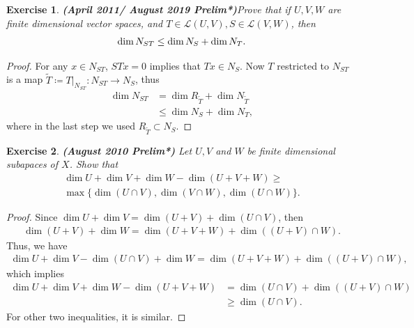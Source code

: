 \documentclass[11pt]{book}
\newtheorem{exercise}{Exercise}[section]
\theoremstyle{definition}
\numberwithin{equation}{chapter}
\begin{document}
\medskip

\begin{exercise}{\bf (April 2011/ August 2019 Prelim*)}\label{April_2011_p1}
Prove that if $U,V,W$ are finite dimensional vector spaces, and $T\in\mathscr{L}(U,V), S\in\mathscr{L}(V,W)$, then
\begin{align*}
    {\rm dim}\, N_{ST} \leq {\rm dim}\, N_S + {\rm dim}\, N_T.
\end{align*}
\end{exercise}
\begin{proof}
For any $x \in N_{ST}$, $STx = 0$ implies that $Tx \in N_S$. Now $T$ restricted to $N_{ST}$ is a map $\widetilde{T} \coloneqq T|_{N_{ST}}: N_{ST} \to N_S$, thus
\begin{align*}
    \dim N_{ST} & = \dim R_{\widetilde{T}} + \dim N_{\widetilde{T}} \\
    & \leq \dim N_S + \dim N_T,
\end{align*}
where in the last step we used $R_{\widetilde{T}} \subset N_S$.
\end{proof}

\medskip

\begin{exercise}{\bf (August 2010 Prelim*)}
Let $U, V$ and $W$ be finite dimensional subapaces of $X$. Show that
\begin{align*}
    \dim U + \dim V + \dim W - \dim (U + V + W) \geq \\
    \max \{\dim(U \cap V), \dim(V \cap W), \dim(U \cap W)\}.
\end{align*}
\end{exercise}
\begin{proof}
Since $\dim U + \dim V = \dim (U + V) + \dim (U \cap V)$, then 
\begin{align*}
    \dim (U+V) + \dim W = \dim (U + V + W) + \dim ((U+V) \cap W).
\end{align*}
Thus, we have
\begin{align*}
    \dim U + \dim V - \dim (U \cap V) + \dim W = \dim (U + V + W) + \dim ((U+V) \cap W),
\end{align*}
which implies
\begin{align*}
    \dim U + \dim V + \dim W - \dim (U + V + W) & = \dim (U \cap V) + \dim ((U+V) \cap W) \\
    & \geq \dim (U \cap V).
\end{align*}
For other two inequalities, it is similar.
\end{proof}

\medskip
\end{document}
